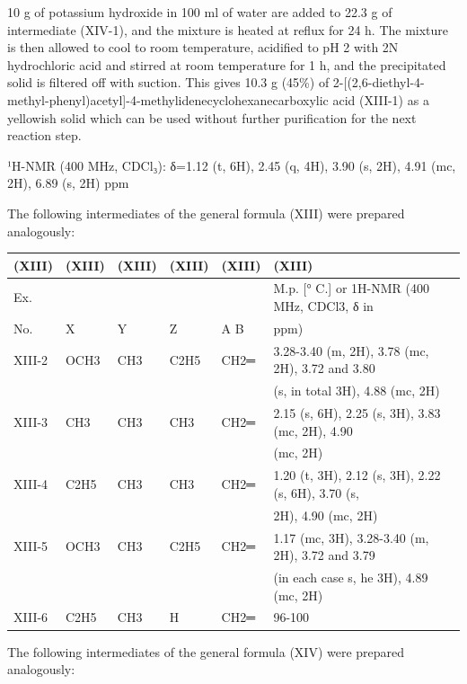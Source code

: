 \documentclass[11pt,a4paper]{article}
\begin{document}
10 g of potassium hydroxide in 100 ml of water are added to 22.3 g of intermediate (XIV-1), and the mixture is heated at reflux for 24 h. The mixture is then allowed to cool to room temperature, acidified to pH 2 with 2N hydrochloric acid and stirred at room temperature for 1 h, and the precipitated solid is filtered off with suction. This gives 10.3 g (45\%) of 2-[(2,6-diethyl-4-methyl-phenyl)acetyl]-4-methylidenecyclohexanecarboxylic acid (XIII-1) as a yellowish solid which can be used without further purification for the next reaction step.

¹H-NMR (400 MHz, CDCl₃): δ=1.12 (t, 6H), 2.45 (q, 4H), 3.90 (s, 2H), 4.91 (mc, 2H), 6.89 (s, 2H) ppm

The following intermediates of the general formula (XIII) were prepared analogously:

\begin{table}[h]
\begin{tabular}{|l|l|l|l|l|l|}
\hline
(XIII) & (XIII) & (XIII) & (XIII) & (XIII) & (XIII) \\ \hline
Ex. &  &  &  &  & M.p. [° C.] or 1H-NMR (400 MHz, CDCl3, δ in \\ \hline
No. & X & Y & Z & A B & ppm) \\ \hline
XIII-2 & OCH3 & CH3 & C2H5 & CH2═ & 3.28-3.40 (m, 2H), 3.78 (mc, 2H), 3.72 and 3.80 \\ \hline
 &  &  &  &  & (s, in total 3H), 4.88 (mc, 2H) \\ \hline
XIII-3 & CH3 & CH3 & CH3 & CH2═ & 2.15 (s, 6H), 2.25 (s, 3H), 3.83 (mc, 2H), 4.90 \\ \hline
 &  &  &  &  & (mc, 2H) \\ \hline
XIII-4 & C2H5 & CH3 & CH3 & CH2═ & 1.20 (t, 3H), 2.12 (s, 3H), 2.22 (s, 6H), 3.70 (s, \\ \hline
 &  &  &  &  & 2H), 4.90 (mc, 2H) \\ \hline
XIII-5 & OCH3 & CH3 & C2H5 & CH2═ & 1.17 (mc, 3H), 3.28-3.40 (m, 2H), 3.72 and 3.79 \\ \hline
 &  &  &  &  & (in each case s, he 3H), 4.89 (mc, 2H) \\ \hline
XIII-6 & C2H5 & CH3 & H & CH2═ & 96-100 \\ \hline
\end{tabular}
\end{table}

The following intermediates of the general formula (XIV) were prepared analogously:
\end{document}
